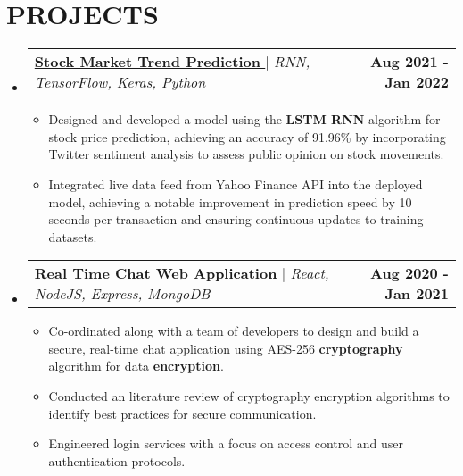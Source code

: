 \documentclass[letterpaper,10pt]{article}
\makeatletter
\newcommand{\resumeItem}[1]{
  \item\small{
    {#1 \vspace{-2pt}}
  }
}
\newcommand{\resumeProjectHeading}[2]{
    \item
    \begin{tabular*}{1.001\textwidth}{l@{\extracolsep{\fill}}r}
      \small#1 & \textbf{\small #2}\\
    \end{tabular*}\vspace{-7pt}
}
\newcommand{\resumeSubHeadingListStart}{\begin{itemize}[leftmargin=0.0in, label={}]}
\newcommand{\resumeSubHeadingListEnd}{\end{itemize}}
\newcommand{\resumeItemListStart}{\begin{itemize}}
\newcommand{\resumeItemListEnd}{\end{itemize}\vspace{-5pt}}
\makeatother
\begin{document}
\section{PROJECTS}
\resumeSubHeadingListStart   
  \resumeProjectHeading {\href{https://www.springerprofessional.de/en/stock-market-trend-prediction-along-with-twitter-sentiment-analy/24659292}{\textbf{\large{Stock Market Trend Prediction}} \href{https://www.springerprofessional.de/en/stock-market-trend-prediction-along-with-twitter-sentiment-analy/24659292}{\raisebox{-0.1\height}\faExternalLink }} $|$ \textit{\normalsize{RNN, TensorFlow, Keras, Python}}}{Aug 2021 - Jan 2022}
  \resumeItemListStart
    \resumeItem{\normalsize{Designed and developed a model using the \textbf{LSTM RNN} algorithm for stock price prediction, achieving an accuracy of 91.96\% by incorporating Twitter sentiment analysis to assess
public opinion on stock movements.}}
    \resumeItem{\normalsize{Integrated live data feed from Yahoo Finance API into the deployed model, achieving a notable improvement in prediction speed by 10 seconds per transaction and ensuring continuous updates to training datasets.}}
  \resumeItemListEnd
  \vspace{-12pt}
  \resumeProjectHeading {\href{https://www.ijraset.com/fileserve.php?FID=35305}{\textbf{\large{Real Time Chat Web Application}} \href{https://www.ijraset.com/fileserve.php?FID=35305}{\raisebox{-0.1\height}\faExternalLink }} $|$ \textit{\normalsize{React, NodeJS, Express, MongoDB}}}{Aug 2020 - Jan 2021}
  \resumeItemListStart
    \resumeItem{\normalsize{Co-ordinated along with a team of developers to design and build a secure, real-time chat application using AES-256 \textbf{cryptography} algorithm for data \textbf{encryption}.}}
    \resumeItem{\normalsize{Conducted an literature review of cryptography encryption algorithms to identify best practices for secure communication.}}
    \resumeItem{\normalsize{Engineered login services with a focus on access control and user authentication protocols.}}
  \resumeItemListEnd
\resumeSubHeadingListEnd
\vspace{-12pt}
\end{document}
